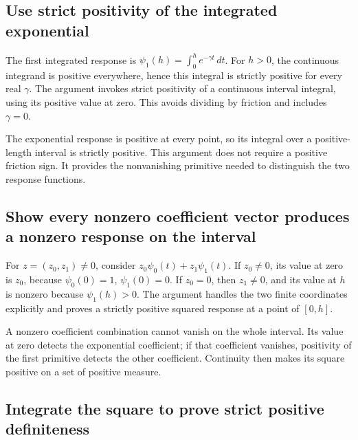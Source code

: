 \documentclass[11pt,a4paper]{report}
\begin{document}
\subsection{\texorpdfstring{Use strict positivity of the integrated exponential}{Use strict positivity of the integrated exponential}}
\label{report-step-KineticLangevin-GramPositive-lean-1}


The first integrated response is \(\psi_1(h)=\int_0^he^{-\gamma t}\,dt\). For \(h>0\), the continuous integrand is positive everywhere, hence this integral is strictly positive for every real \(\gamma\). The argument invokes strict positivity of a continuous interval integral, using its positive value at zero. This avoids dividing by friction and includes \(\gamma=0\).



The exponential response is positive at every point, so its integral over a positive-length interval is strictly positive. This argument does not require a positive friction sign. It provides the nonvanishing primitive needed to distinguish the two response functions.

\subsection{\texorpdfstring{Show every nonzero coefficient vector produces a nonzero response on the interval}{Show every nonzero coefficient vector produces a nonzero response on the interval}}
\label{report-step-KineticLangevin-GramPositive-lean-2}


For \(z=(z_0,z_1)\ne0\), consider \(z_0\psi_0(t)+z_1\psi_1(t)\). If \(z_0\ne0\), its value at zero is \(z_0\), because \(\psi_0(0)=1\), \(\psi_1(0)=0\). If \(z_0=0\), then \(z_1\ne0\), and its value at \(h\) is nonzero because \(\psi_1(h)>0\). The argument handles the two finite coordinates explicitly and proves a strictly positive squared response at a point of \([0,h]\).



A nonzero coefficient combination cannot vanish on the whole interval. Its value at zero detects the exponential coefficient; if that coefficient vanishes, positivity of the first primitive detects the other coefficient. Continuity then makes its square positive on a set of positive measure.

\subsection{\texorpdfstring{Integrate the square to prove strict positive definiteness}{Integrate the square to prove strict positive definiteness}}
\label{report-step-KineticLangevin-GramPositive-lean-3}
\end{document}
